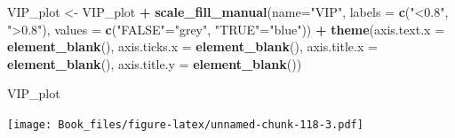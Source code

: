\documentclass[
]{book}
\newenvironment{Shaded}{\begin{snugshade}}{\end{snugshade}}
\newcommand{\DataTypeTok}[1]{\textcolor[rgb]{0.13,0.29,0.53}{#1}}
\newcommand{\KeywordTok}[1]{\textcolor[rgb]{0.13,0.29,0.53}{\textbf{#1}}}
\newcommand{\NormalTok}[1]{#1}
\newcommand{\OperatorTok}[1]{\textcolor[rgb]{0.81,0.36,0.00}{\textbf{#1}}}
\newcommand{\StringTok}[1]{\textcolor[rgb]{0.31,0.60,0.02}{#1}}
\begin{document}
\begin{Shaded}
\begin{Highlighting}[]
\NormalTok{VIP_plot <-}\StringTok{ }\NormalTok{VIP_plot }\OperatorTok{+}
\StringTok{  }\KeywordTok{scale_fill_manual}\NormalTok{(}\DataTypeTok{name=}\StringTok{"VIP"}\NormalTok{, }
                    \DataTypeTok{labels =} \KeywordTok{c}\NormalTok{(}\StringTok{"<0.8"}\NormalTok{, }\StringTok{">0.8"}\NormalTok{), }
                    \DataTypeTok{values =} \KeywordTok{c}\NormalTok{(}\StringTok{"FALSE"}\NormalTok{=}\StringTok{"grey"}\NormalTok{, }\StringTok{"TRUE"}\NormalTok{=}\StringTok{"blue"}\NormalTok{)) }\OperatorTok{+}
\StringTok{  }\KeywordTok{theme}\NormalTok{(}\DataTypeTok{axis.text.x =} \KeywordTok{element_blank}\NormalTok{(),}
        \DataTypeTok{axis.ticks.x =} \KeywordTok{element_blank}\NormalTok{(),}
        \DataTypeTok{axis.title.x =} \KeywordTok{element_blank}\NormalTok{(),}
        \DataTypeTok{axis.title.y =} \KeywordTok{element_blank}\NormalTok{())}

\NormalTok{VIP_plot}
\end{Highlighting}
\end{Shaded}

\texttt{[image: Book\_files/figure-latex/unnamed-chunk-118-3.pdf]}
\end{document}
